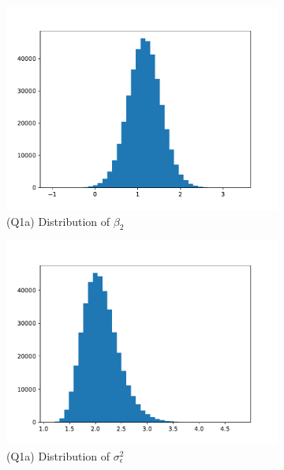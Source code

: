 \documentclass{homeworg}
\begin{document}
\begin{figure}[H]
\begin{subfigure}{0.48\textwidth}
	\includegraphics[width=\textwidth]{q1_a_beta2.pdf}
	\caption{(Q1a) Distribution of $\beta_2$}
\end{subfigure}
\begin{subfigure}{0.48\textwidth}
	\centering
	\includegraphics[width=\textwidth]{q1_a_sigmae.pdf}
	\caption{(Q1a) Distribution of $\sigma_\epsilon^2$}
\end{subfigure}
\begin{subfigure}{0.48\textwidth}
	\centering

\end{subfigure}
\end{figure}
\end{document}
